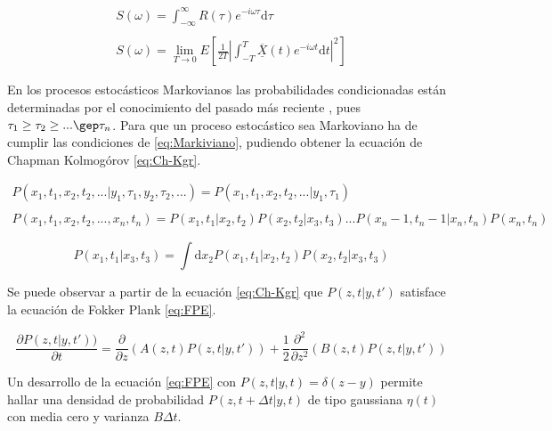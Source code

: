 	\begin{equation}
		\begin{matrix}
			S(\omega) = \int_{-\infty }^{\infty } R(\tau) e^{-i\omega\tau} \mathrm{d} \tau \\ \\
			S(\omega) = \lim_{T \rightarrow 0} E\left[\frac{1}{2T} \left| \int_{-T }^{T} \overline{\underline{X}}(t) e^{-i\omega t} \mathrm{d} t \right| ^2 \right ]
		\end{matrix}
		\label{eq:kintchine}
	\end{equation}

En los procesos estoc\'asticos Markovianos las probabilidades condicionadas est\'an determinadas por el conocimiento del pasado m\'as reciente , pues $\tau_1 \geq \tau_2 \geq ... \gep \tau_n$. Para que un proceso estoc\'astico sea Markoviano ha de cumplir las condiciones de \ref{eq:Markiviano}, pudiendo obtener la ecuaci\'on de Chapman Kolmog\'orov \ref{eq:Ch-Kgr}.

	\begin{equation}
		\begin{matrix}
			P(x_1, t_1, x_2, t_2, ...| y_1, \tau_1, y_2, \tau_2, ...) = P(x_1, t_1, x_2, t_2, ...| y_1, \tau_1) \\ \\
			P(x_1, t_1, x_2, t_2, ..., x_n, t_n) = P(x_1, t_1|x_2, t_2)P(x_2, t_2|x_3, t_3)...P(x_n-1, t_n-1|x_n, t_n)P(x_n, t_n)
		\end{matrix}
		\label{eq:Markiviano}	
	\end{equation}

	\begin{equation}
		P(x_1, t_1|x_3, t_3) = \int \mathrm{d}x_2 P(x_1, t_1|x_2, t_2)P(x_2, t_2|x_3, t_3)
		\label{eq:Ch-Kgr}
	\end{equation}

Se puede observar a partir de la ecuaci\'on \ref{eq:Ch-Kgr} que $P(z, t| y, t')$ satisface la ecuaci\'on de Fokker Plank \ref{eq:FPE}.

	\begin{equation}
		\frac{\partial P(z, t|y, t'))}{\partial t} = \frac{\partial }{\partial z}\left(A(z, t)P(z, t|y, t') \right ) + \frac{1}{2} \frac{\partial^2 }{\partial z^2}\left(B(z, t)P(z, t|y, t') \right )	
		\label{eq:FPE}
	\end{equation}

	Un desarrollo de la ecuaci\'on \ref{eq:FPE} con $P(z, t|y, t) = \delta(z-y)$ permite hallar una densidad de probabilidad $P(z, t+\Delta t | y, t)$ de tipo gaussiana $\eta(t)$ con media cero y varianza $B\Delta t$.

